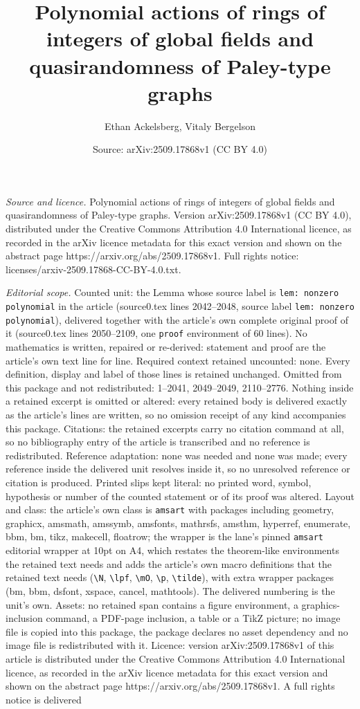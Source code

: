 \documentclass[10pt,a4paper]{amsart}
\title[Polynomial actions of rings of integers of global fields and]{Polynomial actions of rings of integers of global fields and quasirandomness of Paley-type graphs}
\author{Ethan Ackelsberg, Vitaly Bergelson}
\date{Source: arXiv:2509.17868v1 (CC BY 4.0)}
\begin{document}
\maketitle

\noindent\emph{Source and licence.} Polynomial actions of rings of integers of global fields and quasirandomness of Paley-type graphs. Version arXiv:2509.17868v1 (CC BY 4.0), distributed under the Creative Commons Attribution 4.0 International licence, as recorded in the arXiv licence metadata for this exact version and shown on the abstract page https://arxiv.org/abs/2509.17868v1. Full rights notice: licenses/arxiv-2509.17868-CC-BY-4.0.txt.\par\smallskip

\noindent\textit{Editorial scope.} Counted unit: the Lemma whose source label is \texttt{lem: nonzero polynomial} in the article (source0.tex lines 2042--2048, source label \texttt{lem: nonzero polynomial}), delivered together with the article's own complete original proof of it (source0.tex lines 2050--2109, one \texttt{proof} environment of 60 lines). No mathematics is written, repaired or re-derived: statement and proof are the article's own text line for line. Required context retained uncounted: none. Every definition, display and label of those lines is retained unchanged. Omitted from this package and not redistributed: 1--2041, 2049--2049, 2110--2776. Nothing inside a retained excerpt is omitted or altered: every retained body is delivered exactly as the article's lines are written, so no omission receipt of any kind accompanies this package. Citations: the retained excerpts carry no citation command at all, so no bibliography entry of the article is transcribed and no reference is redistributed. Reference adaptation: none was needed and none was made; every reference inside the delivered unit resolves inside it, so no unresolved reference or citation is produced. Printed slips kept literal: no printed word, symbol, hypothesis or number of the counted statement or of its proof was altered. Layout and class: the article's own class is \texttt{amsart} with packages including geometry, graphicx, amsmath, amssymb, amsfonts, mathrsfs, amsthm, hyperref, enumerate, bbm, bm, tikz, makecell, floatrow; the wrapper is the lane's pinned \texttt{amsart} editorial wrapper at 10pt on A4, which restates the theorem-like environments the retained text needs and adds the article's own macro definitions that the retained text needs (\texttt{\textbackslash N}, \texttt{\textbackslash lpf}, \texttt{\textbackslash mO}, \texttt{\textbackslash p}, \texttt{\textbackslash tilde}), with extra wrapper packages (bm, bbm, dsfont, xspace, cancel, mathtools). The delivered numbering is the unit's own. Assets: no retained span contains a figure environment, a graphics-inclusion command, a PDF-page inclusion, a table or a TikZ picture; no image file is copied into this package, the package declares no asset dependency and no image file is redistributed with it. Licence: version arXiv:2509.17868v1 of this article is distributed under the Creative Commons Attribution 4.0 International licence, as recorded in the arXiv licence metadata for this exact version and shown on the abstract page https://arxiv.org/abs/2509.17868v1. A full rights notice is delivered 
\end{document}
